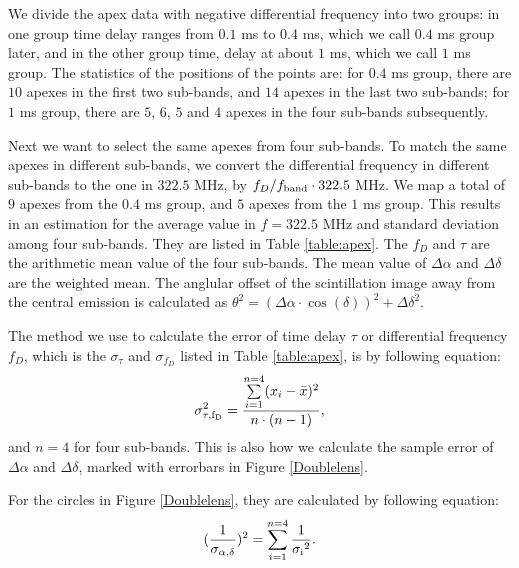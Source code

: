 \documentclass[useAMS,usenatbib]{mn2e}
\begin{document}
We divide the apex data with negative differential frequency into two groups: in one group time delay ranges from $0.1$ ms to $0.4$ ms, which we call $0.4$ ms group later, and in the other group time, delay at about $1$ ms, which we call $1$ ms group. The statistics of the positions of the points are: for $0.4$ ms group, there are $10$ apexes in the first two sub-bands, and $14$ apexes in the last two sub-bands; for $1$ ms group, there are $5$, $6$, $5$ and $4$ apexes in the four sub-bands subsequently. 

Next we want to select the same apexes from four sub-bands. To match the same apexes in different sub-bands, we convert the differential frequency in different sub-bands to the one in $322.5$ MHz, by $f_D/f_{\rm band}\cdot322.5$ MHz. We map
a total of $9$ apexes from the $0.4$ ms group, and $5$ apexes from the $1$ ms
group. This results in an estimation
for the average value in $f=322.5$ MHz and standard deviation among four sub-bands. They are listed in Table
\ref{table:apex}. The $f_D$ and $\tau$ are the arithmetic mean value of the four sub-bands. 
The mean value of $\Delta\alpha$ and $\Delta\delta$ are the weighted mean.
The anglular offset of the scintillation image away from the central emission is calculated as ${\theta}^2=({\Delta\alpha}\cdot\cos(\delta))^2+{\Delta\delta}^2$. 

The method we use to calculate the error of time delay $\tau$ or differential frequency $f_D$, which is the $\sigma_{\tau}$ and $\sigma_{f_D}$ listed in Table \ref{table:apex}, is by following equation:
\begin{align*}
{\sigma^2_{\rm \tau, f_D}} = \frac{\sum\limits^{n=4}_{i=1}(x_i-\bar{x})^2}{n\cdot(n-1)},
\end{align*}
and $n=4$ for four sub-bands. This is also how we calculate the sample error of $\Delta\alpha$ and $\Delta\delta$, marked with errorbars in Figure \ref{Doublelens}.

For the circles in Figure \ref{Doublelens}, they are calculated by following equation:
\begin{align*}
(\frac{1}{\sigma_{\rm \alpha, \delta}})^2 = \sum\limits^{n=4}_{i=1}{\frac{1}{{ \rm \sigma_i}^2}}.
\end{align*}
\end{document}
